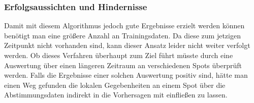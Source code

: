 \subsubsection{Erfolgsaussichten und Hindernisse}
Damit mit diesem Algorithmus jedoch gute Ergebnisse erzielt werden
können benötigt man eine größere Anzahl an Trainingsdaten. Da diese
zum jetzigen Zeitpunkt nicht vorhanden sind, kann dieser Ansatz leider
nicht weiter verfolgt werden. Ob dieses Verfahren überhaupt zum Ziel
führt müsste durch eine Auswertung über einen längeren Zeitraum an
verschiedenen Spots überprüft werden. Falls die Ergebnisse einer
solchen Auswertung positiv sind, hätte man einen Weg gefunden die
lokalen Gegebenheiten an einem Spot über die Abstimmungsdaten indirekt
in die Vorhersagen mit einfließen zu lassen.


